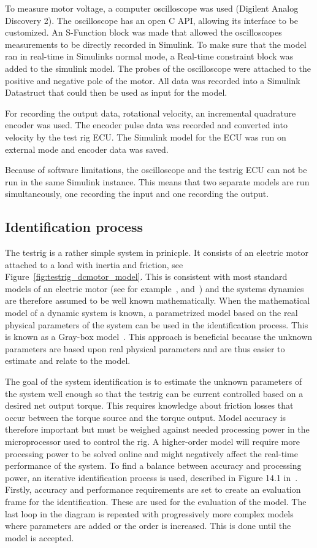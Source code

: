 To measure motor voltage, a computer oscilloscope was used (Digilent Analog
Discovery 2). The oscilloscope has an open C API, allowing its interface to be
customized. An S-Function block was made that allowed the oscilloscopes
measurements to be directly recorded in Simulink. To make sure that the model
ran in real-time in Simulinks normal mode, a Real-time constraint block was
added to the simulink model. The probes of the oscilloscope were attached to
the positive and negative pole of the motor. All data was recorded into a
Simulink Datastruct that could then be used as input for the model. 

For recording the output data, rotational velocity, an incremental quadrature
encoder was used. The encoder pulse data was recorded and converted into
velocity by the test rig ECU\@. The Simulink model for the ECU was run on external
mode and encoder data was saved. 

Because of software limitations, the oscilloscope and the testrig ECU can not be
run in the same Simulink instance. This means that two separate models are run
simultaneously, one recording the input and one recording the output.

\subsection{Identification process}
The testrig is a rather simple system in prinicple. It consists of an electric
motor attached to a load with inertia and friction, see
Figure~\ref{fig:testrig_dcmotor_model}.  This is consistent with most standard
models of an electric motor (see for example~\cite{beloiu2014},
\cite{reglerteknik2006} and~\cite{modeling1994}) and the systems dynamics are
therefore assumed to be well known mathematically. When the mathematical model
of a dynamic system is known, a parametrized model based on the real
physical parameters of the system can be used in the identification process.
This is known as a Gray-box model~\cite{modeling1994}. This approach is
beneficial because the unknown parameters are based upon real physical
parameters and are thus easier to estimate and relate to the model. 

The goal of the system identification is to estimate the unknown parameters of the
system well enough so that the testrig can be current controlled based on a 
desired net output torque. This requires knowledge about friction losses that
occur between the torque source and the torque output. Model accuracy is therefore
important but must be weighed against needed processing power in the microprocessor
used to control the rig. A higher-order model will require more processing power
to be solved online and might negatively affect the real-time performance of the
system. To find a balance between accuracy and processing power, an iterative
identification process is used, described in Figure 14.1 in~\cite{modeling1994}. 
Firstly, accuracy and performance requirements are set to create an evaluation
frame for the identification. These are used for the evaluation of the model. 
The last loop in the diagram is repeated with progressively more complex models
where parameters are added or the order is increased. This is done until the
model is accepted.

